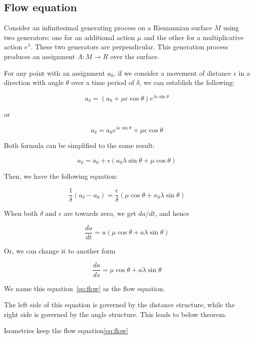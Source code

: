 \subsection{Flow equation}\label{sec:equation}

Consider an infinitesimal generating process on a Riemannian surface $M$ using two generators:
one for an additional action $\mu$ and the other for a multiplicative action $e^\lambda$.
These two generators are perpendicular.
This generation process produces an assignment $A: M \to R$ over the surface.

For any point with an assignment $a_0$, if we consider a movement of distance $\epsilon$ in a direction with angle $\theta$
over a time period of $\delta$, we can establish the following:

\[
    a_{\delta} = (a_0 + \mu \epsilon \cos \theta)e^{\lambda \epsilon \sin \theta}
\]

or

\[
    a_{\delta} = a_0 e^{\lambda \epsilon \sin \theta} + \mu \epsilon \cos \theta
\]

Both formula can be simplified to the same result:

\[
    a_{\delta} = a_0 + \epsilon (a_0 \lambda \sin \theta + \mu \cos \theta)
\]

Then, we have the following equation:

\[
    \frac{1}{\delta} (a_{\delta} - a_0) = \frac{\epsilon}{\delta} (\mu \cos \theta + x_0 \lambda \sin \theta)
\]

When both $\delta$ and $\epsilon$ are towards zero, we get $da / dt$, and hence

\[
    \frac{da}{dt} = u (\mu \cos \theta + a \lambda \sin \theta)
\]

Or, we can change it to another form

\begin{equation}
    \frac{da}{ds} = \mu \cos \theta + a \lambda \sin \theta\label{eq:flow}
\end{equation}

We name this equation~\eqref{eq:flow} as the flow equation.

The left side of this equation is governed by the distance structure, while the right side is governed by the angle structure.
This leads to below theorem.

\begin{theorem}
Isometries keep the flow equation\eqref{eq:flow}
\label{thm:isometry}
\end{theorem}

